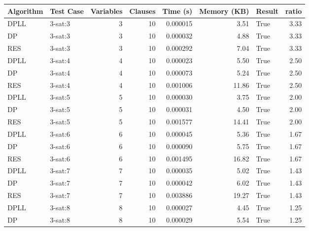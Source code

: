 \begin{tabular}{llrrrrlr}
\toprule
 Algorithm   & Test Case   &   Variables &   Clauses &   Time (s) &   Memory (KB) & Result   &   ratio \\
\midrule
 DPLL        & 3-sat:3     &           3 &        10 &   0.000015 &          3.51 & True     &    3.33 \\
 DP          & 3-sat:3     &           3 &        10 &   0.000032 &          4.88 & True     &    3.33 \\
 RES         & 3-sat:3     &           3 &        10 &   0.000292 &          7.04 & True     &    3.33 \\
 DPLL        & 3-sat:4     &           4 &        10 &   0.000023 &          5.50 & True     &    2.50 \\
 DP          & 3-sat:4     &           4 &        10 &   0.000073 &          5.24 & True     &    2.50 \\
 RES         & 3-sat:4     &           4 &        10 &   0.001006 &         11.86 & True     &    2.50 \\
 DPLL        & 3-sat:5     &           5 &        10 &   0.000030 &          3.75 & True     &    2.00 \\
 DP          & 3-sat:5     &           5 &        10 &   0.000031 &          4.50 & True     &    2.00 \\
 RES         & 3-sat:5     &           5 &        10 &   0.001577 &         14.41 & True     &    2.00 \\
 DPLL        & 3-sat:6     &           6 &        10 &   0.000045 &          5.36 & True     &    1.67 \\
 DP          & 3-sat:6     &           6 &        10 &   0.000090 &          5.75 & True     &    1.67 \\
 RES         & 3-sat:6     &           6 &        10 &   0.001495 &         16.82 & True     &    1.67 \\
 DPLL        & 3-sat:7     &           7 &        10 &   0.000035 &          5.02 & True     &    1.43 \\
 DP          & 3-sat:7     &           7 &        10 &   0.000042 &          6.02 & True     &    1.43 \\
 RES         & 3-sat:7     &           7 &        10 &   0.003886 &         19.27 & True     &    1.43 \\
 DPLL        & 3-sat:8     &           8 &        10 &   0.000027 &          4.45 & True     &    1.25 \\
 DP          & 3-sat:8     &           8 &        10 &   0.000029 &          5.54 & True     &    1.25 \\

\end{tabular}
